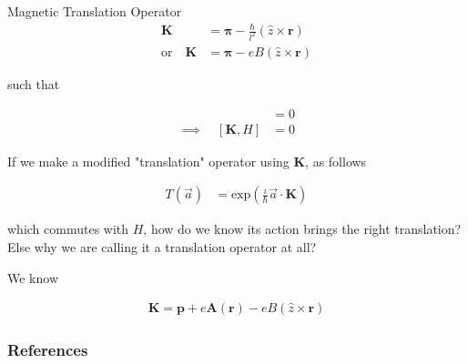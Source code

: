 \documentclass{beamer}
\newcommand{\bsym}{\boldsymbol}
\newcommand{\non}{\nonumber}
\begin{document}
\begin{frame}[allowframebreaks]{Magnetic Translation Operator}
		\begin{align}
			\bsym{K} &= \bsym{\pi} - \frac{\hbar}{l^2}(\hat{z}\times \bsym{r}) \\
			\text{or}\quad \bsym{K} &= \bsym{\pi} - eB(\hat{z}\times \bsym{r}) \non
		\end{align}
		
		such that 
		
		\begin{align*}
			[\bsym{K},\bsym{\pi}]&=0 \\
			\implies\quad [\bsym{K},H]&=0 
		\end{align*}
				
		\framebreak %
		
		If we make a modified "translation" operator using $\bsym{K}$, as follows
		
		\begin{align}
    			T(\vec{a}) &= \text{exp}\left( \frac{\iota}{\hbar}{\vec{a}\cdot\bsym{K}}\right)
    		\end{align}
		 
		which commutes with $H$, how do we know its action brings the right translation? Else why we are calling 
		it a translation operator at all?
		
		\framebreak %

		We know
		
		\begin{align}
    			\bsym{K} = \bsym{p} + e\bsym{A}(\bsym{r}) - eB(\hat{z} \times \bsym{r})
    		\end{align}
		
	\end{frame}

	

	\begin{frame}
  		\frametitle{References}
	\end{frame}
\end{document}
